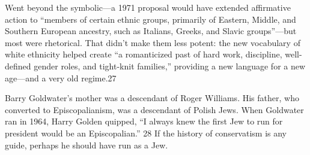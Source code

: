  \par 
Went beyond the symbolic—a 1971 proposal would have extended affirmative action to “members of certain ethnic groups, primarily of Eastern, Middle, and Southern European ancestry, such as Italians, Greeks, and Slavic groups”—but most were rhetorical. That didn’t make them less potent: the new vocabulary of white ethnicity helped create “a romanticized past of hard work, discipline, well-defined gender roles, and tight-knit families,” providing a new language for a new age—and a very old regime.{\color{blue}27}
 \par 
Barry Goldwater’s mother was a descendant of Roger Williams. His father, who converted to Episcopalianism, was a descendant of Polish Jews. When Goldwater ran in 1964, Harry Golden quipped, “I always knew the first Jew to run for president would be an Episcopalian.” {\color{blue}28} If the history of conservatism is any guide, perhaps he should have run as a Jew.